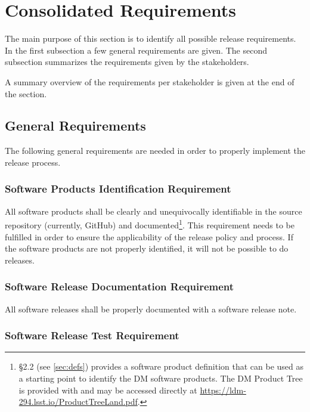 \newpage
\section{Consolidated Requirements} \label{sec:reqdef}

The main purpose of this section is to identify all possible release requirements.
In the first subsection a few general requirements are given.
The second subsection summarizes the requirements given by the stakeholders.

A summary overview of the requirements per stakeholder is given at the end of the section.


\subsection{General Requirements} \label{sec:genreq}

The following general requirements are needed in order to properly implement the release process.


\subsubsection{Software Products Identification Requirement} \label{sec:swid}

All software products shall be clearly and unequivocally identifiable in the source repository (currently, GitHub) and documented\footnote{
 \S2.2 (see \ref{sec:defs}) provides a software product definition that can be used as a starting point to identify the DM software products.
The DM Product Tree is provided with  and may be accessed directly at \url{https://ldm-294.lsst.io/ProductTreeLand.pdf}.}.
This requirement needs to be fulfilled in order to ensure the applicability of the release policy and process.
If the software products are not properly identified, it will not be possible to do releases.


\subsubsection{Software Release Documentation Requirement} \label{sec:reqdoc}

All software releases shall be properly documented with a software release note.


\subsubsection{Software Release Test Requirement} \label{sec:test}


